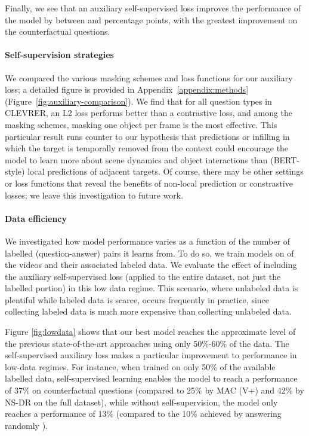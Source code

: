 \documentclass{article}
\begin{document}
Finally, we see that an auxiliary self-supervised  loss improves the performance of the model by between  and  percentage points, with the greatest improvement on the counterfactual questions.





\paragraph{Self-supervision strategies}
We compared the various masking schemes and loss functions for our auxiliary loss;
a detailed figure is provided in Appendix~\ref{appendix:methods} (Figure~\ref{fig:auxiliary-comparison}).
 We find that for all question types in CLEVRER, an L2 loss performs better than a contrastive loss, and among the masking schemes, masking one object per frame is the most effective.
 This particular result runs counter to
 our hypothesis that predictions or infilling in which the target is temporally removed from the context could encourage the model to learn more about scene dynamics and object interactions than (BERT-style) local predictions of adjacent targets.
 Of course, there may be other settings or loss functions that reveal the benefits of non-local prediction or constrastive losses; we leave this investigation to future work. 

\paragraph{Data efficiency}
We investigated how model performance varies as a function of the number of labelled (question-answer) pairs it learns from. To do so, we train models on  of the videos
and their associated labeled data.
We evaluate the effect of including the auxiliary self-supervised loss
(applied to the entire dataset, not just the labelled portion) in this low data regime.
This scenario, where unlabeled data is plentiful while labeled data is scarce,
occurs frequently in practice,  since collecting labeled data is much more expensive than collecting unlabeled data.

Figure \ref{fig:lowdata} shows that our best model reaches the approximate level of the previous state-of-the-art approaches using only 50\%-60\% of the data.
The self-supervised auxiliary loss makes a particular improvement to performance in low-data regimes.
For instance, when trained on only 50\% of the available labelled data, self-supervised learning enables the model to reach a performance of 37\% on counterfactual questions (compared to 25\% by MAC (V+) and 42\% by NS-DR on the full dataset),
while without self-supervision,
the model only reaches a performance of 13\% (compared to the 10\% achieved by answering randomly \citep{clevrer}).
\end{document}
